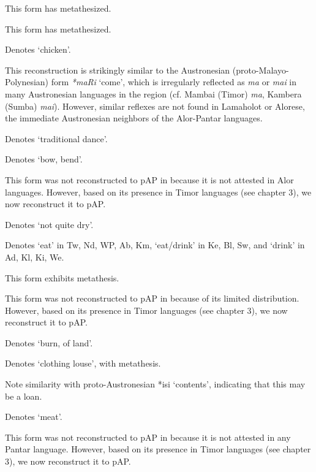{\tablenotetext}{This form has metathesized. }

{\tablenotetext}{This form has metathesized. }

{\tablenotetext}{Denotes `chicken'.}

{\tablenotetext}{This reconstruction is strikingly similar to the Austronesian (proto-Malayo-Polynesian) form \textit{*maRi} `come', which is irregularly reflected as \textit{ma} or \textit{mai }in many Austronesian languages in the region (cf. Mambai (Timor) \textit{ma}, Kambera (Sumba) \textit{mai}). However, similar reflexes are not found in Lamaholot or Alorese, the immediate Austronesian neighbors of the Alor-Pantar languages.}

{\tablenotetext}{Denotes `traditional dance'.}

{\tablenotetext}{Denotes `bow, bend'.}

{\tablenotetext}{This form was not reconstructed to pAP in \citet{HoltonEtAl2012} because it is not attested in Alor languages. However, based on its presence in Timor languages (see chapter 3), we now reconstruct it to pAP.}

{\tablenotetext}{Denotes `not quite dry'.}

{\tablenotetext}{Denotes `eat' in Tw, Nd, WP, Ab, Km, `eat/drink' in Ke, Bl, Sw, and `drink' in Ad, Kl, Ki, We.}

{\tablenotetext}{This form exhibits metathesis. }

{\tablenotetext}{This form was not reconstructed to pAP in \citet{HoltonEtAl2012} because of its limited distribution. However, based on its presence in Timor languages (see chapter 3), we now reconstruct it to pAP.}

{\tablenotetext}{Denotes `burn, of land'.}

{\tablenotetext}{Denotes `clothing louse', with metathesis. }

{\tablenotetext}{Note similarity with proto-Austronesian *isi{\textglotstop} `contents', indicating that this may be a loan.}

{\tablenotetext}{Denotes `meat'.}

{\tablenotetext}{This form was not reconstructed to pAP in \citet{HoltonEtAl2012} because it is not attested in any Pantar language. However, based on its presence in Timor languages (see chapter 3), we now reconstruct it to pAP.}


